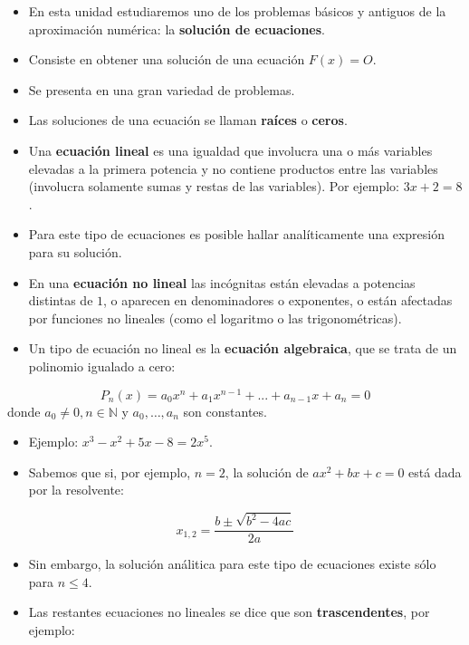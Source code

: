 \documentclass[]{book}
\begin{document}
\begin{itemize}
\item
  En esta unidad estudiaremos uno de los problemas básicos y antiguos de la aproximación numérica: la \textbf{solución de ecuaciones}.
\item
  Consiste en obtener una solución de una ecuación \(F(x) = O\).
\item
  Se presenta en una gran variedad de problemas.
\item
  Las soluciones de una ecuación se llaman \textbf{raíces} o \textbf{ceros}.
\item
  Una \textbf{ecuación lineal} es una igualdad que involucra una o más variables elevadas a la primera potencia y no contiene productos entre las variables (involucra solamente sumas y restas de las variables). Por ejemplo: \(3x+2 = 8\).
\item
  Para este tipo de ecuaciones es posible hallar analíticamente una expresión para su solución.
\item
  En una \textbf{ecuación no lineal} las incógnitas están elevadas a potencias distintas de \(1\), o aparecen en denominadores o exponentes, o están afectadas por funciones no lineales (como el logaritmo o las trigonométricas).
\item
  Un tipo de ecuación no lineal es la \textbf{ecuación algebraica}, que se trata de un polinomio igualado a cero:
\end{itemize}

\[
P_n(x) = a_0 x^n + a_1 x^{n-1} + ... + a_{n-1} x + a_n = 0
\]
donde \(a_0 \ne 0, n \in \mathbb{N}\) y \(a_0, \dots, a_n\) son constantes.

\begin{itemize}
\item
  Ejemplo: \(x^3 - x^2 + 5x - 8 = 2x^5\).
\item
  Sabemos que si, por ejemplo, \(n = 2\), la solución de \(ax^2 + b x + c = 0\) está dada por la resolvente:
\end{itemize}

\[
x_{1,2} = \frac{b \pm \sqrt{b^2 - 4ac}}{2a}
\]

\begin{itemize}
\item
  Sin embargo, la solución análitica para este tipo de ecuaciones existe sólo para \(n \le 4\).
\item
  Las restantes ecuaciones no lineales se dice que son \textbf{trascendentes}, por ejemplo:
\end{itemize}
\end{document}

